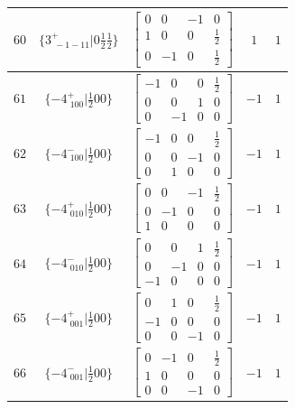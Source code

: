 \documentclass[fleqn,8pt]{jsarticle}
\begin{document}
\begin{longtable}{ccccc}
$ 60 $ & $ \{3^{+}_{\,\,-1-11}|0 \frac{1}{2} \frac{1}{2}\} $ & $ \begin{bmatrix} 0 & 0 & -1 & 0 \\ 1 & 0 & 0 & \frac{1}{2} \\ 0 & -1 & 0 & \frac{1}{2} \end{bmatrix} $ & $ 1 $ & $ 1 $ \\ \hline
$ 61 $ & $ \{-4^{+}_{\,\,100}|\frac{1}{2} 0 0\} $ & $ \begin{bmatrix} -1 & 0 & 0 & \frac{1}{2} \\ 0 & 0 & 1 & 0 \\ 0 & -1 & 0 & 0 \end{bmatrix} $ & $ -1 $ & $ 1 $ \\ \hline
$ 62 $ & $ \{-4^{-}_{\,\,100}|\frac{1}{2} 0 0\} $ & $ \begin{bmatrix} -1 & 0 & 0 & \frac{1}{2} \\ 0 & 0 & -1 & 0 \\ 0 & 1 & 0 & 0 \end{bmatrix} $ & $ -1 $ & $ 1 $ \\ \hline
$ 63 $ & $ \{-4^{+}_{\,\,010}|\frac{1}{2} 0 0\} $ & $ \begin{bmatrix} 0 & 0 & -1 & \frac{1}{2} \\ 0 & -1 & 0 & 0 \\ 1 & 0 & 0 & 0 \end{bmatrix} $ & $ -1 $ & $ 1 $ \\ \hline
$ 64 $ & $ \{-4^{-}_{\,\,010}|\frac{1}{2} 0 0\} $ & $ \begin{bmatrix} 0 & 0 & 1 & \frac{1}{2} \\ 0 & -1 & 0 & 0 \\ -1 & 0 & 0 & 0 \end{bmatrix} $ & $ -1 $ & $ 1 $ \\ \hline
$ 65 $ & $ \{-4^{+}_{\,\,001}|\frac{1}{2} 0 0\} $ & $ \begin{bmatrix} 0 & 1 & 0 & \frac{1}{2} \\ -1 & 0 & 0 & 0 \\ 0 & 0 & -1 & 0 \end{bmatrix} $ & $ -1 $ & $ 1 $ \\ \hline
$ 66 $ & $ \{-4^{-}_{\,\,001}|\frac{1}{2} 0 0\} $ & $ \begin{bmatrix} 0 & -1 & 0 & \frac{1}{2} \\ 1 & 0 & 0 & 0 \\ 0 & 0 & -1 & 0 \end{bmatrix} $ & $ -1 $ & $ 1 $ \\ \hline

\end{longtable}
\end{document}

